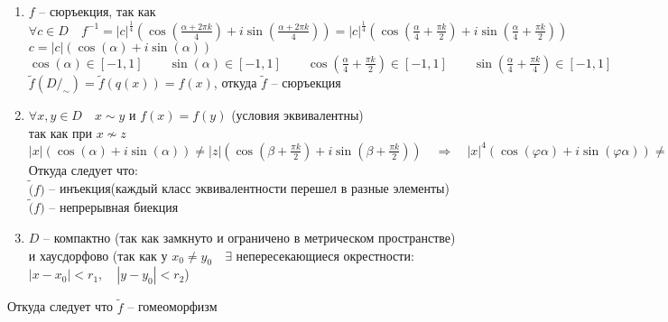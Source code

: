 		\begin{enumerate}
			\item 
				$f$ -- сюръекция, так как $\forall c \in D\quad f^{-1} = |c|^{\frac{1}{4}}(\cos(\frac{\alpha + 2\pi k}{4}) + i\sin(\frac{\alpha + 2\pi k}{4})) = |c|^{\frac{1}{4}}(\cos(\frac{\alpha}{4} + \frac{\pi k}{2}) + i\sin(\frac{\alpha}{4} + \frac{\pi k}{2}))$\\
				$c = |c|(\cos(\alpha) + i\sin(\alpha))$\\
				$\cos(\alpha) \in [-1,1]\qquad \sin(\alpha) \in [-1,1]\qquad \cos(\frac{\alpha}{4} + \frac{\pi k}{2}) \in [-1,1]\qquad \sin(\frac{\alpha}{4} + \frac{\pi k}{4}) \in [-1,1]$\\
				$\tilde{f}(D\slash_{\sim}) = \tilde{f}(q(x)) = f(x)$, откуда $\tilde{f}$ -- сюръекция
			\item
				$\forall x,y \in D\quad x \sim y$ и $f(x) = f(y)$ (условия эквивалентны)\\
				так как при $x \not\sim z$\\
				$|x|(\cos(\alpha) + i\sin(\alpha)) \ne |z|(\cos(\beta + \frac{\pi k}{2}) + i\sin(\beta + \frac{\pi k}{2}))\quad \Rightarrow \quad |x|^{4}(\cos(\varphi\alpha) + i\sin(\varphi\alpha)) \ne |z|^{4}(\cos(\varphi\beta) + i\sin(\phi\beta) + i\sin(\varphi\beta))\qquad f(x) \ne f(z)$\\
				Откуда следует что: \\
				$\tilde(f)$ -- инъекция(каждый класс эквивалентности перешел в разные элементы) \\
				$\tilde(f)$ -- непрерывная биекция
			\item
				$D$ -- компактно (так как замкнуто и ограничено в метрическом пространстве) и хаусдорфово (так как у $x_0 \ne y_0\quad \exists$ непересекающиеся окрестности: $|x - x_0| < r_1,\quad |y - y_0| < r_2$)
		\end{enumerate}
		Откуда следует что $\tilde{f}$ -- гомеоморфизм\\
		\\
		
